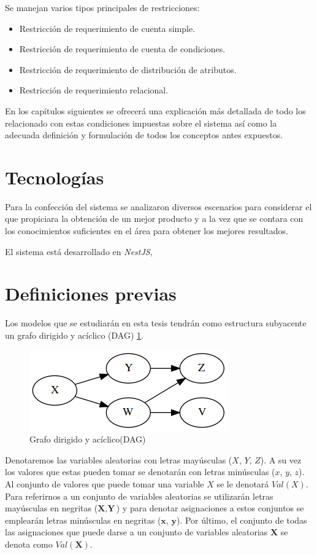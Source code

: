Se manejan varios tipos principales de restricciones:
\begin{itemize}

	\item Restricción de requerimiento de cuenta simple.
	\item Restricción de requerimiento de cuenta de condiciones.
	\item Restricción de requerimiento de distribución de atributos.
	\item Restricción de requerimiento relacional.

\end{itemize}

En los capítulos siguientes se ofrecerá una explicación más detallada de todo los relacionado con estas condiciones impuestas sobre el sistema así como la adecuada definición y formulación de todos los conceptos antes expuestos.

\section{Tecnologías}
Para la confección del sistema se analizaron diversos escenarios para considerar el que propiciara la obtención de un mejor producto y a la vez que se contara con los conocimientos suficientes en el área para obtener los mejores resultados. 

El sistema está desarrollado en \textit{NestJS},  

\section{Definiciones previas}
Los modelos que se estudiarán en esta tesis tendrán como estructura subyacente un grafo dirigido y acíclico (DAG) \ref{fig:dag}.

\begin{figure}[h!]
	\centering
	\includegraphics[width=0.5\linewidth]{images/Chapter 2/dag}
	\caption{Grafo dirigido y acíclico(DAG)}
	\label{fig:dag}
\end{figure}

Denotaremos las variables aleatorias con letras mayúsculas ($X$, $Y$, $Z$). A su vez los valores que estas pueden tomar se denotarán con letras minúsculas ($x$, $y$, $z$). Al conjunto de valores que puede tomar una variable $X$ se le denotará $Val(X)$. Para referirnos a un conjunto de variables aleatorias se utilizarán letras mayúsculas en negritas ($\textbf{X},\textbf{Y}$) y para denotar asignaciones a estos conjuntos se emplearán letras minúsculas en negritas ($\textbf{x}$, $\textbf{y}$). Por último, el conjunto de todas las asignaciones que puede darse a un conjunto de variables aleatorias $\textbf{X}$ se denota como $Val(\textbf{X})$.

